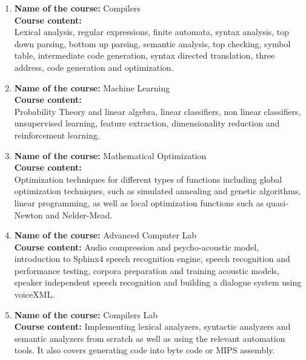 \documentclass{article}
\begin{document}
\begin{enumerate}
  \item \textbf{Name of the course:} Compilers\\
    \textbf{Course content:}\\
   Lexical analysis, regular expressions, finite automata, syntax analysis, top
   down parsing, bottom up parsing, semantic analysis, top checking, symbol table, intermediate code generation, syntax directed translation, three
   address, code generation and optimization.

  \item \textbf{Name of the course:} Machine Learning\\
    \textbf{Course content:}\\
    Probability Theory and linear algebra, linear classifiers, non linear
    classifiers, unsupervised learning, feature extraction, dimensionality reduction
    and reinforcement learning.


  \item \textbf{Name of the course:} Mathematical Optimization \\
    \textbf{Course content:} \\
    Optimization techniques for different types of functions including global
    optimization techniques, such as simulated annealing and genetic algorithms,
    linear programming, as well as local optimization functions such as
    quasi-Newton and Nelder-Mead.

    
  \item \textbf{Name of the course:} Advanced Computer Lab \\
    \textbf{Course content:}
Audio compression and psycho-acoustic
model, introduction to Sphinx4 speech recognition engine, speech recognition and
performance testing, corpora preparation and training acoustic models, speaker
independent speech recognition and building a dialogue system using voiceXML.


  \item \textbf{Name of the course:} Compilers Lab \\
    \textbf{Course content:}
   Implementing lexical analyzers, syntactic analyzers and semantic analyzers
   from scratch as well as using the relevant automation tools. It also covers
   generating code into byte code or MIPS assembly. 

  
    \end{enumerate}

\enddocument
\end{document}

